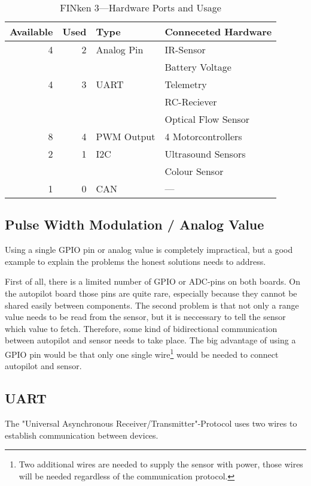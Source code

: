 \begin{table}[h]
	\centering
	\begin{tabular}{|r|r | l | l|}
		\hline
		Available  & Used & Type       & Conneceted Hardware \\ \hline \hline
		4          &   2  & Analog Pin & IR-Sensor \\
		           &      &            & Battery Voltage \\ \hline
		4          &   3  & UART       & Telemetry \\
		           &      &            & RC-Reciever\\
		           &      &            & Optical Flow Sensor\\ \hline
		8          &   4  & PWM Output & 4 Motorcontrollers\\ \hline
		2          &   1  & I2C        & Ultrasound Sensors\\ \hline
		           &      &            & Colour Sensor\\ \hline
		1          &   0  & CAN        & — \\ \hline
	\end{tabular}
	\caption{FINken 3—Hardware Ports and Usage}
	\label{hwconnection}
\end{table}

\subsection{Pulse Width Modulation / Analog Value}
Using a single GPIO pin or analog value is completely impractical, but a good example to explain the problems the honest solutions needs to address.

First of all, there is a limited number of GPIO or ADC-pins on both boards.
On the autopilot board those pins are quite rare, especially because they cannot be shared easily between components.
The second problem is that not only a range value needs to be read from the sensor, but it is neccessary to tell the sensor which value to fetch.
Therefore, some kind of bidirectional communication between autopilot and sensor needs to take place.
The big advantage of using a GPIO pin would be that only one single wire\footnote{Two additional wires are needed to supply the sensor with power, those wires will be needed regardless of the communication protocol.} would be needed to connect autopilot and sensor.

\subsection{UART}
The "Universal Asynchronous Receiver/Transmitter"-Protocol uses two wires to establish communication between devices.
\cite{wingen_automatic_2004}

